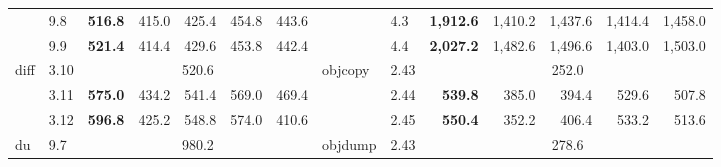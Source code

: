 \begin{table}[]
{\begin{tabular}{l|l|rrrrr||l|l|rrrrr}
                            & 9.8     & \multicolumn{1}{r|}{\textbf{516.8}}   & \multicolumn{1}{r|}{415.0}   & \multicolumn{1}{r|}{425.4}   & \multicolumn{1}{r|}{454.8}   & 443.6                      &                          & 4.3     & \multicolumn{1}{r|}{\textbf{1,912.6}}  & \multicolumn{1}{r|}{1,410.2}  & \multicolumn{1}{r|}{1,437.6}  & \multicolumn{1}{r|}{1,414.4}  & 1,458.0                   \\ \cmidrule(lr){2-7} \cmidrule{9-14} 
                            & 9.9     & \multicolumn{1}{r|}{\textbf{521.4}}   & \multicolumn{1}{r|}{414.4}   & \multicolumn{1}{r|}{429.6}   & \multicolumn{1}{r|}{453.8}   & 442.4                      &                          & 4.4     & \multicolumn{1}{r|}{\textbf{2,027.2}}  & \multicolumn{1}{r|}{1,482.6}  & \multicolumn{1}{r|}{1,496.6}  & \multicolumn{1}{r|}{1,403.0}  & 1,503.0                   \\ \midrule
    \multirow{3}{*}{diff}   & 3.10    & \multicolumn{5}{c||}{520.6}                                                                                                                             & \multirow{3}{*}{objcopy} & 2.43    & \multicolumn{5}{c}{252.0}                                                                                                                                 \\ \cmidrule(lr){2-7} \cmidrule{9-14} 
                            & 3.11    & \multicolumn{1}{r|}{\textbf{575.0}}   & \multicolumn{1}{r|}{434.2}   & \multicolumn{1}{r|}{541.4}   & \multicolumn{1}{r|}{569.0}   & 469.4                      &                          & 2.44    & \multicolumn{1}{r|}{\textbf{539.8}}    & \multicolumn{1}{r|}{385.0}    & \multicolumn{1}{r|}{394.4}    & \multicolumn{1}{r|}{529.6}    & 507.8                     \\ \cmidrule(lr){2-7} \cmidrule{9-14} 
                            & 3.12    & \multicolumn{1}{r|}{\textbf{596.8}}   & \multicolumn{1}{r|}{425.2}   & \multicolumn{1}{r|}{548.8}   & \multicolumn{1}{r|}{574.0}   & 410.6                      &                          & 2.45    & \multicolumn{1}{r|}{\textbf{550.4}}    & \multicolumn{1}{r|}{352.2}    & \multicolumn{1}{r|}{406.4}    & \multicolumn{1}{r|}{533.2}    & 513.6                     \\ \midrule
    \multirow{3}{*}{du}     & 9.7     & \multicolumn{5}{c||}{980.2}                                                                                                                             & \multirow{3}{*}{objdump} & 2.43    & \multicolumn{5}{c}{278.6}                                                                                                                                 \\ \cmidrule(lr){2-7} \cmidrule{9-14} 

\end{tabular}}
\end{table}
